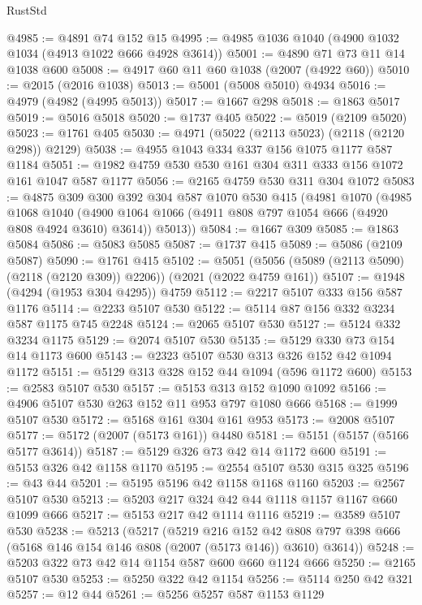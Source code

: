 \begin{lexlean}{RustStd}
\begin{coremodule}
{\begin{coremodule}
{{{{{{{{{{{{{{{{@4985 := @4891 @74 @152 @15
@4995 := @4985 @1036 @1040 (@4900 @1032 @1034 (@4913 @1022 @666 @4928 @3614))
@5001 := @4890 @71 @73 @11 @14 @1038 @600
@5008 := @4917 @60 @11 @60 @1038 (@2007 (@4922 @60))
@5010 := @2015 (@2016 @1038)
@5013 := @5001 (@5008 @5010) @4934
@5016 := @4979 (@4982 (@4995 @5013))
@5017 := @1667 @298
@5018 := @1863 @5017
@5019 := @5016 @5018
@5020 := @1737 @405
@5022 := @5019 (@2109 @5020)
@5023 := @1761 @405
@5030 := @4971 (@5022 (@2113 @5023) (@2118 (@2120 @298)) @2129)
@5038 := @4955 @1043 @334 @337 @156 @1075 @1177 @587 @1184
@5051 := @1982 @4759 @530 @530 @161 @304 @311 @333 @156 @1072 @161 @1047 @587 @1177
@5056 := @2165 @4759 @530 @311 @304 @1072
@5083 := @4875
    @309
    @300
    @392
    @304
    @587
    @1070
    @530
    @415
    (@4981
      @1070
      (@4985
        @1068
        @1040
        (@4900 @1064 @1066 (@4911 @808 @797 @1054 @666 (@4920 @808 @4924 @3610) @3614))
        @5013))
@5084 := @1667 @309
@5085 := @1863 @5084
@5086 := @5083 @5085
@5087 := @1737 @415
@5089 := @5086 (@2109 @5087)
@5090 := @1761 @415
@5102 := @5051 (@5056 (@5089 (@2113 @5090) (@2118 (@2120 @309)) @2206)) (@2021 (@2022 @4759 @161))
@5107 := @1948 (@4294 (@1953 @304 @4295)) @4759
@5112 := @2217 @5107 @333 @156 @587 @1176
@5114 := @2233 @5107 @530
@5122 := @5114 @87 @156 @332 @3234 @587 @1175 @745 @2248
@5124 := @2065 @5107 @530
@5127 := @5124 @332 @3234 @1175
@5129 := @2074 @5107 @530
@5135 := @5129 @330 @73 @154 @14 @1173 @600
@5143 := @2323 @5107 @530 @313 @326 @152 @42 @1094 @1172
@5151 := @5129 @313 @328 @152 @44 @1094 (@596 @1172 @600)
@5153 := @2583 @5107 @530
@5157 := @5153 @313 @152 @1090 @1092
@5166 := @4906 @5107 @530 @263 @152 @11 @953 @797 @1080 @666
@5168 := @1999 @5107 @530
@5172 := @5168 @161 @304 @161 @953
@5173 := @2008 @5107
@5177 := @5172 (@2007 (@5173 @161)) @4480
@5181 := @5151 (@5157 (@5166 @5177 @3614))
@5187 := @5129 @326 @73 @42 @14 @1172 @600
@5191 := @5153 @326 @42 @1158 @1170
@5195 := @2554 @5107 @530 @315 @325
@5196 := @43 @44
@5201 := @5195 @5196 @42 @1158 @1168 @1160
@5203 := @2567 @5107 @530
@5213 := @5203 @217 @324 @42 @44 @1118 @1157 @1167 @660 @1099 @666
@5217 := @5153 @217 @42 @1114 @1116
@5219 := @3589 @5107 @530
@5238 := @5213
    (@5217
      (@5219
        @216
        @152
        @42
        @808
        @797
        @398
        @666
        (@5168 @146 @154 @146 @808 (@2007 (@5173 @146)) @3610)
        @3614))
@5248 := @5203 @322 @73 @42 @14 @1154 @587 @600 @660 @1124 @666
@5250 := @2165 @5107 @530
@5253 := @5250 @322 @42 @1154
@5256 := @5114 @250 @42 @321
@5257 := @12 @44
@5261 := @5256 @5257 @587 @1153 @1129
}}}}}}}}}}}}}}}}
\end{coremodule}}
\end{coremodule}
\end{lexlean}

